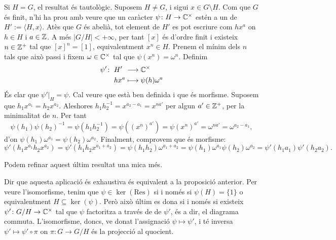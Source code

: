 \begin{pf}
    Si $H = G$, el resultat és tautològic. Suposem $H \neq G$, i sigui $x \in G \setminus H$. Com que $G$ és finit, n'hi ha prou amb veure que un caràcter $\psi \colon H \to \mathbb C^\times$ estén a un de $H' := \langle H, x \rangle$. Atès que $G$ és abelià, tot element de $H'$ es pot escriure com $hx^a$ on $h \in H$ i $a \in \mathbb Z$. A més $|G/H| < + \infty$, per tant $[x]$ és d'ordre finit i existeix $n \in \mathbb Z^+$ tal que $[x]^n = [1]$, equivalentment $x^n \in H$. Prenem el mínim dels $n$ tals que això passi i fixem $\omega \in \mathbb C^\times$ tal que $\psi(x^n) = \omega^n$. Definim 
    \[
        \begin{alignedat}{2}
            \psi'\colon\;&H' \;&\longrightarrow \;& \mathbb C^\times\\
            &hx^a \;&\longmapsto \;& \psi(h)\omega^a
        \end{alignedat} 
    \]
    És clar que $\psi'|_H = \psi$. Cal veure que està ben definida i que és morfisme. Suposem que $h_1x^{a_1} = h_2x^{a_2}$. Aleshores
    $h_1 h_2^{-1} = x^{a_2 - a_1} = x^{na'}$ per algun $a' \in \mathbb Z^+$, per la minimalitat de $n$. Per tant 
    \[
        \psi(h_1)\psi(h_2)^{-1} = \psi(h_1 h_2^{-1}) = \psi((x^n)^{a'}) = \psi(x^n)^{a'} = \omega^{na'} = \omega^{a_2 - a_1},
    \] d'on $\psi(h_1)\omega^{a_1} = \psi(h_2)\omega^{a_2}$. Finalment, comprovem que és morfisme:
    \[
        \psi'(h_1x^{a_1} h_2x^{a_2}) = \psi'(h_1 h_2 x^{a_1 + a_2}) = \psi(h_1 h_2) \omega^{a_1 + a_2} =
        \psi(h_1) \omega^{a_1}\psi(h_2) \omega^{a_2} = \psi'(h_1a_1)\psi'(h_2a_2).
    \]
\end{pf}
Podem refinar aquest últim resultat una mica més.
    \begin{minipage}{0.8\linewidth}
        \begin{pf}
    Dir que aquesta aplicació és exhaustiva és equivalent a la proposició anterior. Per veure l'isomorfisme, tenim que $\psi \in \ker(\mathrm{Res})$ si i només si $\psi(H) = \{1\}$ o equivalentment $H \subseteq \ker(\psi)$. Però això últim es dona si i només si existeix $\psi' \colon G/H \to \mathbb C^\times$ tal que $\psi$ factoritza a través de de $\psi'$, és a dir, el diagrama commuta. L'isomorfisme, doncs, ve donat l'assignació $\psi \mapsto \psi'$, i té inversa $\psi' \mapsto \psi' \circ \pi$ on $\pi \colon G \to G/H$ és la projecció al quocient.\end{pf}
\end{minipage}

